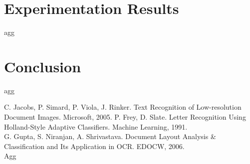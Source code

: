 \documentclass[12pt]{IEEEtran}
\begin{document}
\section{Experimentation Results}

agg

\section{Conclusion}

agg

\begin{thebibliography}{1}
 C. Jacobs, P. Simard, P. Viola, J. Rinker. Text Recognition of Low-resolution Document Images. Microsoft, 2005.
 P. Frey, D. Slate. Letter Recognition Using Holland-Style
Adaptive Classifiers. Machine Learning, 1991. \\
 G. Gupta, S. Niranjan, A. Shrivastava. Document Layout Analysis \& Classification and Its Application in OCR. EDOCW, 2006. \\
 Agg
\end{thebibliography}

\end{document}
